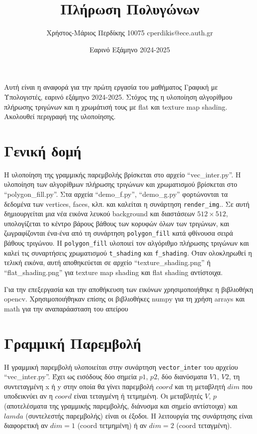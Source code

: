 \documentclass{article}
\title{Πλήρωση Πολυγώνων}
\date{Εαρινό Εξάμηνο 2024-2025}
\author{Χρήστος-Μάριος Περδίκης 10075 cperdikis@ece.auth.gr}
\begin{document}
\maketitle

Αυτή είναι η αναφορά για την πρώτη εργασία του μαθήματος Γραφική με 
Υπολογιστές, εαρινό εξάμηνο 2024-2025. Στόχος της η υλοποίηση αλγορίθμου
πλήρωσης τριγώνων και η χρωμάτισή τους με flat και texture map
shading. Ακολουθεί περιγραφή της υλοποίησης.

\section{Γενική δομή}
Η υλοποίηση της γραμμικής παρεμβολής βρίσκεται στο αρχείο ``vec\_inter.py''. 
Η υλοποίηση των αλγορίθμων πλήρωσης τριγώνων και χρωματισμού βρίσκεται στο
``polygon\_fill.py''. Στα αρχεία ``demo\_f.py'', ``demo\_g.py'' φορτώνονται 
τα δεδομένα των vertices, faces, κλπ. και καλείται η συνάρτηση \verb|render_img|..
Σε αυτή δημιουργείται μια νέα εικόνα λευκού background και διαστάσεων $512\times512$, υπολογίζεται το κέντρο 
βάρους βάθους των κορυφών όλων των τριγώνων, και ζωγραφίζονται 
ένα-ένα από τη συνάρτηση \verb|polygon_fill| κατά φθίνουσα σειρά βάθους τριγώνου.
Η \verb|polygon_fill| υλοποιεί τον αλγόριθμο πλήρωσης τριγώνων και καλεί τις 
συναρτήσεις χρωματισμού \verb|t_shading| και \verb|f_shading|. Όταν ολοκληρωθεί 
η τελική εικόνα, αυτή αποθηκεύεται σε αρχείο ``texture\_shading.png'' ή ``flat\_shading.png''
για texture map shading και flat shading αντίστοιχα.

Για την επεξεργασία και την αποθήκευση των εικόνων χρησιμοποιήθηκε η βιβλιοθήκη
opencv. Χρησιμο\-ποιήθηκαν επίσης οι βιβλιοθήκες numpy για τη χρήση arrays και
math για την αναπαράασταση του απείρου

\section{Γραμμική Παρεμβολή}
Η γραμμική παρεμβολή υλοποιείται στην συνάρτηση \verb|vector_inter| του αρχείου 
``vec\_inter.py''. Έχει ως εισόδους δύο σημεία $p1$, $p2$, δύο διανύσματα $V1$,
$V2$, τη συντεταγμένη x ή y στην οποία θα γίνει παρεμβολή $coord$ και τη μεταβλητή
$dim$ που υποδεικνύει αν η $coord$ είναι τεταγμένη ή τετμημένη. Οι μεταβλητές 
$V$, $p$ (αποτελέσματα της γραμμικής παρεμβολής, διάνυσμα και σημείο αντίστοιχα) και 
$lamda$ (συντελεστής παρεμβολής) είναι οι έξοδοι. Η λειτουργία της 
συνάρτησης είναι διαφορετική αν $dim = 1$ (coord τετμημένη) ή αν $dim = 2$ 
(coord τεταγμένη). 
\end{document}
